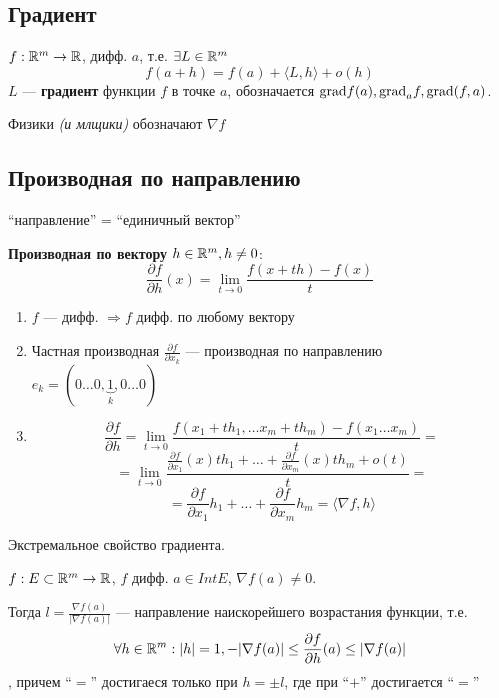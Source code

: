 \subsection*{\centering Градиент}

\begin{definition}
    $f:\mathbb{R}^m\to\mathbb{R}$, дифф. $a$, т.е. $\exists L\in\mathbb{R}^m$
    $$f(a+h)=f(a)+\langle L, h\rangle + o(h)$$
    $L$ --- \textbf{градиент} функции $f$ в точке $a$, обозначается $\text{grad} f(a), \text{grad}_a f, \text{grad}(f, a)$.
    
    Физики \textit{(и млщики)} обозначают $\nabla f$
\end{definition}

\subsection*{\centering Производная по направлению}

``направление'' = ``единичный вектор''

\begin{definition}
    \textbf{Производная по вектору} $h\in\mathbb{R}^m, h\not=0$:
    $$\frac{\partial f}{\partial h}(x) = \lim_{t\to0} \frac{f(x+th)-f(x)}{t}$$
\end{definition}

\begin{enumerate}
    \item $f$ --- дифф. $\Rightarrow f$ дифф. по любому вектору
    \item Частная производная $\frac{\partial f}{\partial x_k}$ --- производная по направлению $e_k=(0 \ldots 0, \underbrace1_{k}, 0 \ldots 0)$
    \item $$\frac{\partial f}{\partial h} = \lim\limits_{t\to0}\frac{f(x_1+th_1, \ldots x_m+th_m)-f(x_1\ldots x_m)}{t}=$$
    $$=\lim\limits_{t\to0}\frac{\frac{\partial f}{\partial x_1}(x) th_1+\ldots+\frac{\partial f}{\partial x_m}(x) th_m+o(t)}{t}=$$
    $$=\frac{\partial f}{\partial x_1}h_1+\ldots+\frac{\partial f}{\partial x_m}h_m=\langle \nabla f, h \rangle$$
\end{enumerate}

\begin{theorem}
    Экстремальное свойство градиента.

    $f:E\subset \mathbb{R}^m\to\mathbb{R}$, $f$ дифф. $a\in Int E$, $\nabla f(a)\not= 0$.
    
    Тогда $l = \frac{\nabla f(a)}{|\nabla f(a)|}$ --- направление наискорейшего возрастания функции, т.е. $$\forall h\in\mathbb{R}^m : |h|=1, -|\nabla f(a)|\le \frac{\partial f}{\partial h}(a) \le |\nabla f(a)|$$
    , причем ``$=$'' достигаеся только при $h=\pm l$, где при ``$+$'' достигается ``$=$'' 
\end{theorem}

